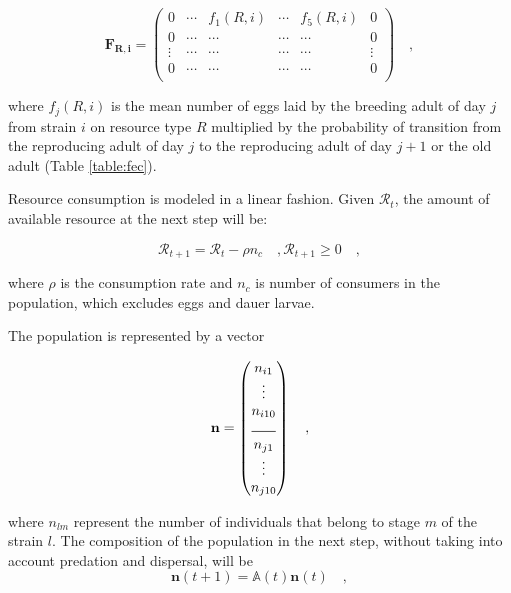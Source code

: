 \documentclass[10pt,letterpaper]{article}
\begin{document}
\begin{equation}
\mathbf{F_{R,i}} = 
\begin{pmatrix}
0 & \cdots & f_1(R,i) & \cdots & f_5(R,i) & 0 \\
0 & \cdots & \cdots & \cdots & \cdots & 0 \\
\vdots & \cdots & \cdots & \cdots & \cdots & \vdots \\
0 & \cdots & \cdots & \cdots & \cdots & 0 \\
\end{pmatrix} \quad ,
\end{equation}

where $f_j(R,i)$ is the mean number of eggs laid by the breeding adult of day $j$ from strain $i$ on resource type $R$ multiplied by the probability of transition from the reproducing adult of day $j$ to the reproducing adult of day $j + 1$ or the old adult (Table \ref{table:fec}).

\hspace{5cm}

Resource consumption is modeled in a linear fashion. Given $\mathcal{R}_t$, the amount of available resource at the next step will be:

\begin{equation}
    \mathcal{R}_{t + 1}  = \mathcal{R}_{t} - \rho n_c \quad ,  \mathcal{R}_{t + 1} \geqslant 0 \quad ,
\label{eq:food}
\end{equation}

where $\rho$ is the consumption rate and $n_c$ is number of consumers in the population, which excludes eggs and dauer larvae. 

\hspace{5cm}

The population is represented by a vector

\begin{equation}
\mathbf{n} = 
\begin{pmatrix}
n_{i1}  \\
\vdots  \\
n_{i10}  \\
\rule{0.05\textwidth}{0.5pt} \\
n_{j1}  \\
\vdots  \\
n_{j10}   \\
\end{pmatrix} \quad ,
\end{equation}

where $n_{l m}$ represent the number of individuals that belong to stage $m$ of the strain $l$. The composition of the population in the next step, without taking into account predation and dispersal, will be
\begin{equation}
    \mathbf{n} (t+1) = \mathbb{A}(t)  \mathbf{n} (t) \quad ,
\label{eq:projection}
\end{equation}
\end{document}
